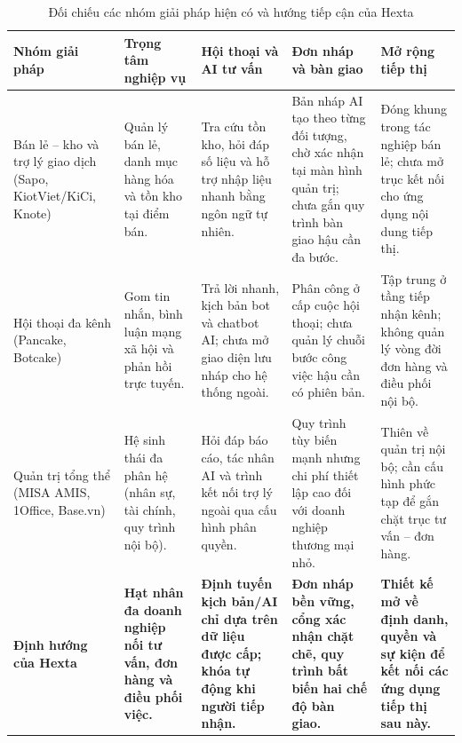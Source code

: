 \begin{table}[htbp]
  \centering
  \small
  \setlength{\tabcolsep}{4pt}
  \renewcommand{\arraystretch}{1.2}
  \caption{Đối chiếu các nhóm giải pháp hiện có và hướng tiếp cận của Hexta}\label{tab:market-comparison}
  \begin{tabularx}{\linewidth}{@{}
    >{\raggedright\arraybackslash}p{2.9cm}
    >{\raggedright\arraybackslash}X
    >{\raggedright\arraybackslash}X
    >{\raggedright\arraybackslash}X
    >{\raggedright\arraybackslash}X@{}}
    \toprule
    Nhóm giải pháp & Trọng tâm nghiệp vụ & Hội thoại và AI tư vấn & Đơn nháp và bàn giao & Mở rộng tiếp thị \\
    \midrule
    Bán lẻ -- kho và trợ lý giao dịch (Sapo, KiotViet/KiCi, Knote) &
    Quản lý bán lẻ, danh mục hàng hóa và tồn kho tại điểm bán. &
    Tra cứu tồn kho, hỏi đáp số liệu và hỗ trợ nhập liệu nhanh bằng ngôn ngữ tự nhiên. &
    Bản nháp AI tạo theo từng đối tượng, chờ xác nhận tại màn hình quản trị; chưa gắn quy trình bàn giao hậu cần đa bước. &
    Đóng khung trong tác nghiệp bán lẻ; chưa mở trục kết nối cho ứng dụng nội dung tiếp thị. \\
    Hội thoại đa kênh (Pancake, Botcake) &
    Gom tin nhắn, bình luận mạng xã hội và phản hồi trực tuyến. &
    Trả lời nhanh, kịch bản bot và chatbot AI; chưa mở giao diện lưu nháp cho hệ thống ngoài. &
    Phân công ở cấp cuộc hội thoại; chưa quản lý chuỗi bước công việc hậu cần có phiên bản. &
    Tập trung ở tầng tiếp nhận kênh; không quản lý vòng đời đơn hàng và điều phối nội bộ. \\
    Quản trị tổng thể (MISA AMIS, 1Office, Base.vn) &
    Hệ sinh thái đa phân hệ (nhân sự, tài chính, quy trình nội bộ). &
    Hỏi đáp báo cáo, tác nhân AI và trình kết nối trợ lý ngoài qua cấu hình phân quyền. &
    Quy trình tùy biến mạnh nhưng chi phí thiết lập cao đối với doanh nghiệp thương mại nhỏ. &
    Thiên về quản trị nội bộ; cần cấu hình phức tạp để gắn chặt trục tư vấn -- đơn hàng. \\
    \textbf{Định hướng của Hexta} &
    \textbf{Hạt nhân đa doanh nghiệp nối tư vấn, đơn hàng và điều phối việc.} &
    \textbf{Định tuyến kịch bản/AI chỉ dựa trên dữ liệu được cấp; khóa tự động khi người tiếp nhận.} &
    \textbf{Đơn nháp bền vững, cổng xác nhận chặt chẽ, quy trình bất biến hai chế độ bàn giao.} &
    \textbf{Thiết kế mở về định danh, quyền và sự kiện để kết nối các ứng dụng tiếp thị sau này.} \\
    \bottomrule
  \end{tabularx}
\end{table}


